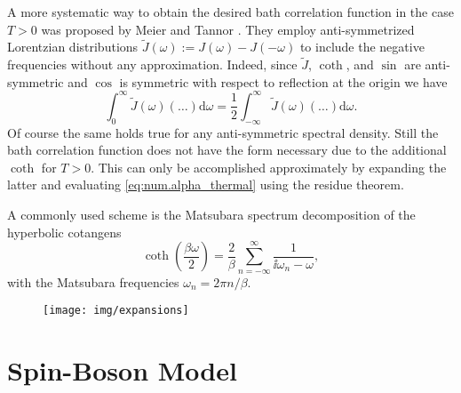 A more systematic way to obtain the desired bath correlation function in the case $T > 0$ was proposed by Meier and Tannor \cite{MeTa99_non_markovian}.
They employ anti-symmetrized Lorentzian distributions $\tilde J(\omega) := J(\omega) - J(-\omega)$ to include the negative frequencies without any approximation.
Indeed, since $\tilde J$, $\coth$, and $\sin$ are anti-symmetric and $\cos$ is symmetric with respect to reflection at the origin we have
\begin{equation*}
  \int_0^\infty \tilde J(\omega) (\dots) \mathrm{d}\omega = \frac{1}{2}\int_{-\infty}^\infty \tilde J(\omega) (\dots) \mathrm{d}\omega.
\end{equation*}
Of course the same holds true for any anti-symmetric spectral density.
Still the bath correlation function does not have the form necessary due to the additional $\coth$ for $T > 0$.
This can only be accomplished approximately by expanding the latter and evaluating \autoref{eq:num.alpha_thermal} using the residue theorem.

A commonly used scheme is the Matsubara spectrum decomposition of the hyperbolic cotangens \cite{Ma00_many_particle}
\begin{equation}
  \coth\left(\frac{\beta \omega}{2}\right) = \frac{2}{\beta} \sum_{n=-\infty}^\infty \frac{1}{\ii\omega_n - \omega},
  \label{eq:num.matsubara_expansion}
\end{equation}
with the Matsubara frequencies $\omega_n = 2\pi n / \beta$.


\begin{figure}
  \centering
  \texttt{[image: img/expansions]}
  \caption{\blindtext}
  \label{fig:num.expansion}
\end{figure}



\section{Spin-Boson Model}
\label{sec:num.spin_boson}


